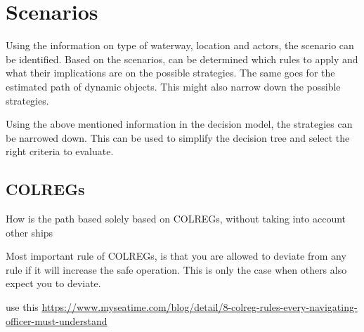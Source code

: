 \section{Scenarios}
Using the information on type of waterway, location and actors, the scenario can be identified. Based on the scenarios, can be determined which rules to apply and what their implications are on the possible strategies. The same goes for the estimated path of dynamic objects. This might also narrow down the possible strategies.

Using the above mentioned information in the decision model, the strategies can be narrowed down. This can be used to simplify the decision tree and select the right criteria to evaluate.

\subsection{COLREGs}
How is the path based solely based on COLREGs, without taking into account other ships

Most important rule of \ac{COLREGs}, is that you are allowed to deviate from any rule if it will increase the safe operation. This is only the case when others also expect you to deviate.

use this \url{https://www.myseatime.com/blog/detail/8-colreg-rules-every-navigating-officer-must-understand}


